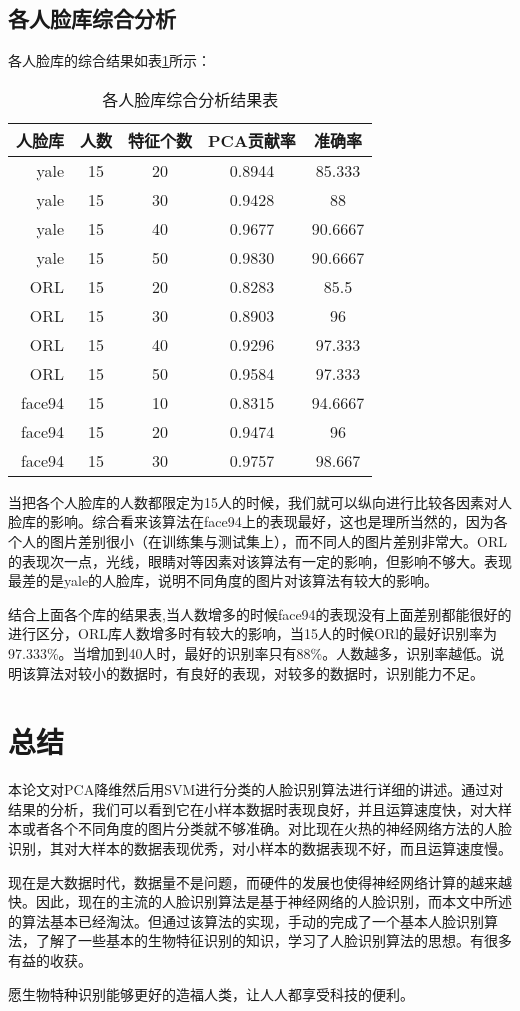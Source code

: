 \documentclass[a4paper,12pt]{ctexart}
\begin{document}
\subsection{各人脸库综合分析}

各人脸库的综合结果如表\ref{tab:zhonghe}所示：

\begin{table}[!htb]
  \centering
\begin{tabular}{|r|c|c|c|c|}
\hline
人脸库&人数&特征个数&PCA贡献率&准确率\\
\hline
yale&   15&     20&     0.8944& 85.333\\
yale&   15&     30&     0.9428& 88\\
yale&   15&     40&     0.9677& 90.6667\\
yale&   15&     50&     0.9830& 90.6667\\
\hline
ORL&    15&     20&     0.8283  &85.5\\
ORL&    15&     30&     0.8903  &96\\
ORL&    15&     40&     0.9296  &97.333\\
ORL&    15&     50&     0.9584  &97.333\\
\hline
face94& 15&     10&     0.8315& 94.6667\\
face94& 15&     20&     0.9474& 96\\
face94& 15&     30&     0.9757& 98.667\\
\hline
\end{tabular}
  \caption{各人脸库综合分析结果表}
  \label{tab:zhonghe}
\end{table}

当把各个人脸库的人数都限定为15人的时候，我们就可以纵向进行比较各因素对人脸库的影响。综合看来该算法在face94上的表现最好，这也是理所当然的，因为各个人的图片差别很小（在训练集与测试集上），而不同人的图片差别非常大。ORL的表现次一点，光线，眼睛对等因素对该算法有一定的影响，但影响不够大。表现最差的是yale的人脸库，说明不同角度的图片对该算法有较大的影响。

结合上面各个库的结果表,当人数增多的时候face94的表现没有上面差别都能很好的进行区分，ORL库人数增多时有较大的影响，当15人的时候ORl的最好识别率为97.333\%。当增加到40人时，最好的识别率只有88\%。人数越多，识别率越低。说明该算法对较小的数据时，有良好的表现，对较多的数据时，识别能力不足。

\section{总结}

本论文对PCA降维然后用SVM进行分类的人脸识别算法进行详细的讲述。通过对结果的分析，我们可以看到它在小样本数据时表现良好，并且运算速度快，对大样本或者各个不同角度的图片分类就不够准确。对比现在火热的神经网络方法的人脸识别，其对大样本的数据表现优秀，对小样本的数据表现不好，而且运算速度慢。

现在是大数据时代，数据量不是问题，而硬件的发展也使得神经网络计算的越来越快。因此，现在的主流的人脸识别算法是基于神经网络的人脸识别，而本文中所述的算法基本已经淘汰。但通过该算法的实现，手动的完成了一个基本人脸识别算法，了解了一些基本的生物特征识别的知识，学习了人脸识别算法的思想。有很多有益的收获。

愿生物特种识别能够更好的造福人类，让人人都享受科技的便利。
\end{document}
